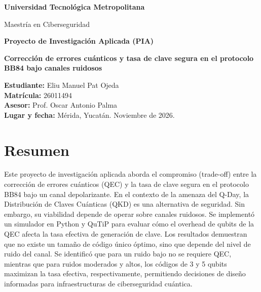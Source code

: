 \documentclass[12pt]{report}
\begin{document}
\begin{titlepage}
    \centering
    \vspace*{2cm}
    {\LARGE\bfseries Universidad Tecnológica Metropolitana \par}
    \vspace{0.5cm}
    {\Large Maestría en Ciberseguridad \par}
    \vspace{2cm}
    {\Huge\bfseries Proyecto de Investigación Aplicada (PIA) \par}
    \vspace{1cm}
    {\Large\bfseries Corrección de errores cuánticos y tasa de clave segura en el protocolo BB84 bajo canales ruidosos \par}
    \vspace{3cm}
    \begin{flushleft}
        \large
        \textbf{Estudiante:} Eliu Manuel Pat Ojeda \\
        \textbf{Matrícula:} 26011494 \\
        \textbf{Asesor:} Prof. Oscar Antonio Palma \\
        \textbf{Lugar y fecha:} Mérida, Yucatán. Noviembre de 2026.
    \end{flushleft}
    \vfill
\end{titlepage}


\chapter*{Resumen}

Este proyecto de investigación aplicada aborda el compromiso (trade-off) entre la corrección de errores cuánticos (QEC) y la tasa de clave segura en el protocolo BB84 bajo un canal depolarizante. En el contexto de la amenaza del Q-Day, la Distribución de Claves Cuánticas (QKD) es una alternativa de seguridad. Sin embargo, su viabilidad depende de operar sobre canales ruidosos. Se implementó un simulador en Python y QuTiP para evaluar cómo el overhead de qubits de la QEC afecta la tasa efectiva de generación de clave. Los resultados demuestran que no existe un tamaño de código único óptimo, sino que depende del nivel de ruido del canal. Se identificó que para un ruido bajo no se requiere QEC, mientras que para ruidos moderados y altos, los códigos de 3 y 5 qubits maximizan la tasa efectiva, respectivamente, permitiendo decisiones de diseño informadas para infraestructuras de ciberseguridad cuántica.
\end{document}
